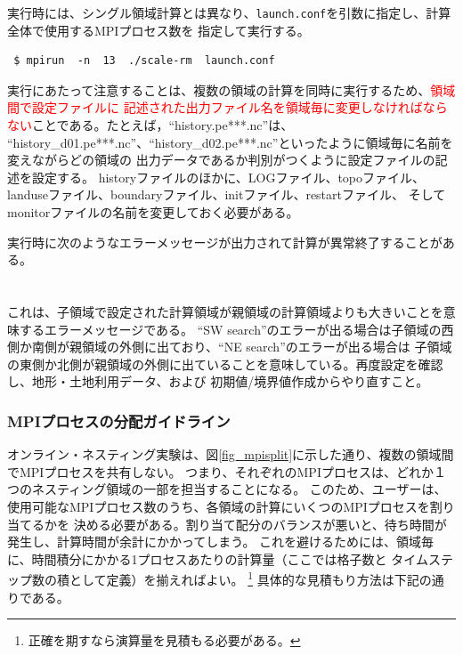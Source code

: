 実行時には、シングル領域計算とは異なり、\verb|launch.conf|を引数に指定し、計算全体で使用するMPIプロセス数を
指定して実行する。
\begin{verbatim}
 $ mpirun  -n  13  ./scale-rm  launch.conf
\end{verbatim}

実行にあたって注意することは、複数の領域の計算を同時に実行するため、\textcolor{red}{領域間で設定ファイルに
記述された出力ファイル名を領域毎に変更しなければならない}ことである。たとえば，``history.pe***.nc''は、
``history\_d01.pe***.nc''、``history\_d02.pe***.nc''といったように領域毎に名前を変えながらどの領域の
出力データであるか判別がつくように設定ファイルの記述を設定する。
historyファイルのほかに、LOGファイル、topoファイル、landuseファイル、boundaryファイル、initファイル、restartファイル、
そしてmonitorファイルの名前を変更しておく必要がある。

実行時に次のようなエラーメッセージが出力されて計算が異常終了することがある。\\

\\

\\

\noindent これは、子領域で設定された計算領域が親領域の計算領域よりも大きいことを意味するエラーメッセージである。
``SW search''のエラーが出る場合は子領域の西側か南側が親領域の外側に出ており、``NE search''のエラーが出る場合は
子領域の東側か北側が親領域の外側に出ていることを意味している。再度設定を確認し、地形・土地利用データ、および
初期値/境界値作成からやり直すこと。


\subsubsection{MPIプロセスの分配ガイドライン}
オンライン・ネスティング実験は、図\ref{fig_mpisplit}に示した通り、複数の領域間でMPIプロセスを共有しない。
つまり、それぞれのMPIプロセスは、どれか１つのネスティング領域の一部を担当することになる。
このため、ユーザーは、使用可能なMPIプロセス数のうち、各領域の計算にいくつのMPIプロセスを割り当てるかを
決める必要がある。割り当て配分のバランスが悪いと、待ち時間が発生し、計算時間が余計にかかってしまう。
これを避けるためには、領域毎に、時間積分にかかる1プロセスあたりの計算量（ここでは格子数と
タイムステップ数の積として定義）を揃えればよい。
\footnote{正確を期すなら演算量を見積もる必要がある。}
具体的な見積もり方法は下記の通りである。

